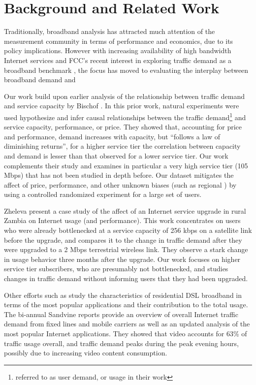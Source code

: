 \section{Background and Related Work}\label{sec:related}

Traditionally, broadband analysis has attracted much attention of the 
measurement community in terms of performance and economics, due to its policy 
implications. However with increasing availability of high bandwidth Internet 
services and FCC's recent interest in exploring traffic demand as a broadband 
benchmark \cite{fcc2015progress-report}, the focus has moved to evaluating the 
interplay between broadband demand and 

Our work build upon earlier analysis of the 
relationship between traffic demand and service capacity by Bischof \ea 
\cite{dasu-imc2014}. In this prior work, natural experiments were used 
hypothesize and infer causal relationships between the traffic 
demand\footnote{referred to as user demand, or usage in their work} and service 
capacity, performance, or price. They showed that, accounting for price and 
performance, demand increases with capacity, but ``follows a law of diminishing 
returns'', \ie for a higher service tier the correlation between capacity and 
demand is lesser than that observed for a lower service tier. Our work 
complements their study and examines in particular a very high service tier (105 
Mbps) that has not been studied in depth before. Our dataset mitigates the 
affect of price, performance, and other unknown biases (such as regional 
\cite{weather, region}) by using a controlled randomized experiment for a large 
set of users.

Zheleva \ea present a case study of the affect of an Internet service 
upgrade in rural Zambia on Internet usage (and performance). This work 
concentrates on users who were already bottlenecked at a service capacity 
of 256 kbps on a satellite link before the upgrade, and compares it to the 
change in traffic demand after they were upgraded to a 2 Mbps terrestrial 
wireless link. They observe a stark change in usage behavior three months 
after the upgrade. Our work focuses on higher service tier subscribers, who are 
presumably not bottlenecked, and studies changes in traffic demand without 
informing users that they had been upgraded.

Other efforts such as \cite{imc102-maier} study the characteristics of 
residential DSL broadband in terms of the most popular applications and their 
contribution to the total usage.
The bi-annual Sandvine reports \cite{sandvine2014report1h, 
sandvine2014report2h} provide an overview of overall Internet traffic 
demand from fixed lines and mobile carriers as well as an updated analysis of 
the most popular Internet applications. They showed that video accounts for 63\%
of traffic usage overall, and traffic demand peaks during the peak evening 
hours, possibly due to increasing video content consumption.


